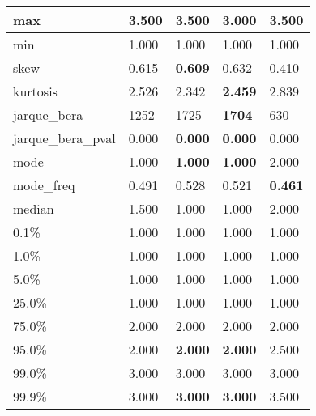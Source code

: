 \begin{table}[H]
\begin{tabular}{|l|m{10em}|m{10em}|m{10em}|m{10em}|}
\hline max & 3.500 & \bfseries 3.500 & \cellcolor[rgb]{0.9, 0.54, 0.52} 3.000 & \bfseries 3.500 \\
\hline min & 1.000 & 1.000 & 1.000 & 1.000 \\
\hline skew & 0.615 & \bfseries 0.609 & 0.632 & \cellcolor[rgb]{0.9, 0.54, 0.52} 0.410 \\
\hline kurtosis & 2.526 & 2.342 & \bfseries 2.459 & \cellcolor[rgb]{0.9, 0.54, 0.52} 2.839 \\
\hline jarque\_bera & 1252 & 1725 & \bfseries 1704 & \cellcolor[rgb]{0.9, 0.54, 0.52} 630 \\
\hline jarque\_bera\_pval & 0.000 & \bfseries 0.000 & \bfseries 0.000 & \cellcolor[rgb]{0.9, 0.54, 0.52} 0.000 \\
\hline mode & 1.000 & \bfseries 1.000 & \bfseries 1.000 & \cellcolor[rgb]{0.9, 0.54, 0.52} 2.000 \\
\hline mode\_freq & 0.491 & \cellcolor[rgb]{0.9, 0.54, 0.52} 0.528 & 0.521 & \bfseries 0.461 \\
\hline median & 1.500 & 1.000 & 1.000 & 2.000 \\
\hline 0.1\% & 1.000 & 1.000 & 1.000 & 1.000 \\
\hline 1.0\% & 1.000 & 1.000 & 1.000 & 1.000 \\
\hline 5.0\% & 1.000 & 1.000 & 1.000 & 1.000 \\
\hline 25.0\% & 1.000 & 1.000 & 1.000 & 1.000 \\
\hline 75.0\% & 2.000 & 2.000 & 2.000 & 2.000 \\
\hline 95.0\% & 2.000 & \bfseries 2.000 & \bfseries 2.000 & \cellcolor[rgb]{0.9, 0.54, 0.52} 2.500 \\
\hline 99.0\% & 3.000 & 3.000 & 3.000 & 3.000 \\
\hline 99.9\% & 3.000 & \bfseries 3.000 & \bfseries 3.000 & \cellcolor[rgb]{0.9, 0.54, 0.52} 3.500 \\
\hline
\end{tabular}
\end{table}
